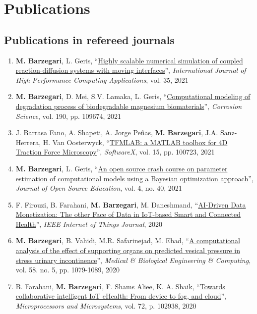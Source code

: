 \documentclass{cv}
\begin{document}

\section{Publications}

\subsection{Publications in refereed journals}
\begin{enumerate}
\item
\textbf{M. Barzegari}, L. Geris, ``\href{https://arxiv.org/abs/2008.11057}{Highly scalable numerical simulation of coupled reaction-diffusion systems with moving interfaces}'', \textit{International Journal of High Performance Computing Applications}, vol. 35, 2021
\item
\textbf{M. Barzegari}, D. Mei, S.V. Lamaka, L. Geris, ``\href{https://doi.org/10.1016/j.corsci.2021.109674}{Computational modeling of degradation process of biodegradable magnesium biomaterials}'', \textit{Corrosion Science}, vol. 190, pp. 109674, 2021
\item
J. Barrasa Fano, A. Shapeti, A. Jorge Peñas, \textbf{M. Barzegari}, J.A. Sanz-Herrera, H. Van Oosterwyck, ``\href{https://doi.org/10.1016/j.softx.2021.100723}{TFMLAB: a MATLAB toolbox for 4D Traction Force Microscopy}'', \textit{SoftwareX}, vol. 15, pp. 100723, 2021 
\item
\textbf{M. Barzegari}, L. Geris, ``\href{https://doi.org/10.21105/jose.00089}{An open source crash course on parameter estimation of computational models using a Bayesian optimization approach}'', \textit{Journal of Open Source Education}, vol. 4, no. 40, 2021
\item
F. Firouzi, B. Farahani, \textbf{M. Barzegari}, M. Daneshmand, ``\href{https://doi.org/10.1109/JIOT.2020.3027971}{AI-Driven Data Monetization: The other Face of Data in IoT-based Smart and Connected Health}'', \textit{IEEE Internet of Things Journal}, 2020
\item
\textbf{M. Barzegari}, B. Vahidi, M.R. Safarinejad, M. Ebad, ``\href{https://doi.org/10.1007/s11517-020-02148-2}{A computational analysis of the effect of supporting organs on predicted vesical pressure in stress urinary incontinence}'', \textit{Medical \& Biological Engineering \& Computing}, vol. 58. no. 5, pp. 1079-1089, 2020
\item
B. Farahani, \textbf{M. Barzegari}, F. Shams Aliee, K. A. Shaik, “\href{https://doi.org/10.1016/j.micpro.2019.102938}{Towards collaborative intelligent IoT eHealth: From device to fog, and cloud}'', \textit{Microprocessors and Microsystems}, vol. 72, p. 102938, 2020

\end{enumerate}
\end{document}
